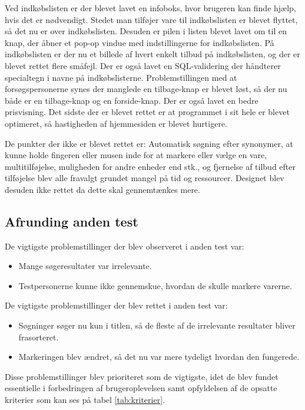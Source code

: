 Ved indkøbslisten er der blevet lavet en infoboks, hvor brugeren kan finde hjælp, hvis det er nødvendigt. Stedet man tilføjer vare til indkøbslisten er blevet flyttet, så det nu er over indkøbslisten. Desuden er pilen i listen blevet lavet om til en knap, der åbner et pop-op vindue med indstillingerne for indkøbslisten. På indkøbslisten er der nu et billede af hvert enkelt tilbud på indkøbslisten, og der er blevet rettet flere småfejl. Der er også lavet en SQL-validering der håndterer specialtegn i navne på indkøbslisterne.
Problemstillingen med at forsøgspersonerne synes der manglede en tilbage-knap er blevet løst, så der nu både er en tilbage-knap og en forside-knap. Der er også lavet en bedre prisvisning. Det sidste der er blevet rettet er at programmet i sit hele er blevet optimeret, så hastigheden af hjemmesiden er blevet hurtigere.


De punkter der ikke er blevet rettet er:
Automatisk søgning efter synonymer, at kunne holde fingeren eller musen inde for at markere eller vælge en vare, multitilføjelse, muligheden for andre enheder end stk., og fjernelse af tilbud efter tilføjelse blev alle fravalgt grundet mangel på tid og ressourcer. Designet blev desuden ikke rettet da dette skal gennemtænkes mere.

\subsection{Afrunding anden test}
De vigtigste problemstillinger der blev observeret i anden test var:
\begin{itemize}
\item Mange søgeresultater var irrelevante.
\item Testpersonerne kunne ikke gennemskue, hvordan de skulle markere varerne.
\end{itemize}
De vigtigste problemstillinger der blev rettet i anden test var:
\begin{itemize}
\item Søgninger søger nu kun i titlen, så de fleste af de irrelevante resultater bliver frasorteret.
\item Markeringen blev ændret, så det nu var mere tydeligt hvordan den fungerede.
\end{itemize}

Disse problemstillinger blev prioriteret som de vigtigste, idet de blev fundet essentielle i forbedringen af brugeroplevelsen samt opfyldelsen af de opsatte kriterier som kan ses på tabel \ref{tab:kriterier}.